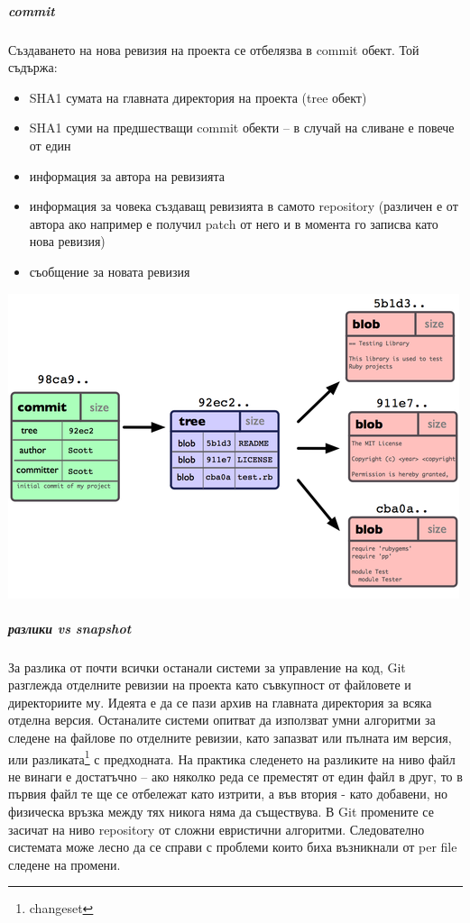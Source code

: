 \documentclass[a4paper]{article}
\begin{document}
      \subparagraph{commit}
      Създаването на нова ревизия на проекта се отбелязва в commit обект. Той съдържа:
      \begin{itemize}
        \item SHA1 сумата на главната директория на проекта (tree обект)
        \item SHA1 суми на предшестващи commit обекти -- в случай на сливане е повече от един
        \item информация за автора на ревизията
        \item информация за човека създаващ ревизията в самото repository
        (различен е от автора ако например е получил patch от него и в момента
        го записва като нова ревизия)
        \item съобщение за новата ревизия
      \end{itemize}

      \begin{center}
        \includegraphics[scale=1.0]{git_commit.png}
      \end{center}

      \subparagraph{разлики vs snapshot} За разлика от почти всички останали
      системи за управление на код, Git разглежда отделните ревизии на проекта
      като съвкупност от файловете и директориите му. Идеята е да се пази архив
      на главната директория за всяка отделна версия. Останалите системи
      опитват да използват умни алгоритми за следене на файлове по отделните
      ревизии, като запазват или пълната им версия, или
      разликата\footnote{changeset} с предходната. На практика следенето на
      разликите на ниво файл не винаги е достатъчно -- ако няколко реда се
      преместят от един файл в друг, то в първия файл те ще се отбележат като
      изтрити, а във втория - като добавени, но физическа връзка между тях
      никога няма да съществува. В Git промените се засичат на ниво repository
      от сложни евристични алгоритми. Следователно системата може лесно да се
      справи с проблеми които биха възникнали от per file следене на промени.
\end{document}
